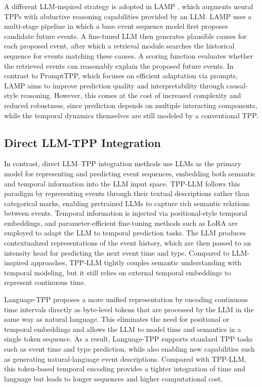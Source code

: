 \documentclass[10pt]{article} %
\begin{document}
A different LLM-inspired strategy is adopted in LAMP \citep{shi2024language}, which augments neural TPPs with abductive reasoning capabilities provided by an LLM. LAMP uses a multi-stage pipeline in which a base event sequence model first proposes candidate future events. A fine-tuned LLM then generates plausible causes for each proposed event, after which a retrieval module searches the historical sequence for events matching these causes. A scoring function evaluates whether the retrieved events can reasonably explain the proposed future events. In contrast to PromptTPP, which focuses on efficient adaptation via prompts, LAMP aims to improve prediction quality and interpretability through causal-style reasoning. However, this comes at the cost of increased complexity and reduced robustness, since prediction depends on multiple interacting components, while the temporal dynamics themselves are still modeled by a conventional TPP. 

\subsection{Direct LLM-TPP Integration}

\label{direct}

In contrast, direct LLM–TPP integration methods use LLMs as the primary model for representing and predicting event sequences, embedding both semantic and temporal information into the LLM input space. TPP-LLM \citep{liu2024tpp} follows this paradigm by representing events through their textual descriptions rather than categorical marks, enabling pretrained LLMs to capture rich semantic relations between events. Temporal information is injected via positional-style temporal embeddings, and parameter-efficient fine-tuning methods such as LoRA are employed to adapt the LLM to temporal prediction tasks. The LLM produces contextualized representations of the event history, which are then passed to an intensity head for predicting the next event time and type. Compared to LLM-inspired approaches, TPP-LLM tightly couples semantic understanding with temporal modeling, but it still relies on external temporal embeddings to represent continuous time.

Language-TPP \citep{kong2025language} proposes a more unified representation by encoding continuous time intervals directly as byte-level tokens that are processed by the LLM in the same way as natural language. This eliminates the need for positional or temporal embeddings and allows the LLM to model time and semantics in a single token sequence. As a result, Language-TPP supports standard TPP tasks such as event time and type prediction, while also enabling new capabilities such as generating natural-language event descriptions. Compared with TPP-LLM, this token-based temporal encoding provides a tighter integration of time and language but leads to longer sequences and higher computational cost.
\end{document}

